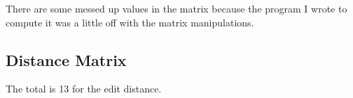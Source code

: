 \begin{center}
There are some messed up values in the matrix because the program I wrote to compute it was a little off with the matrix manipulations.
\end{center}
\subsection{Distance Matrix}
The total is 13 for the edit distance.
\pagebreak
